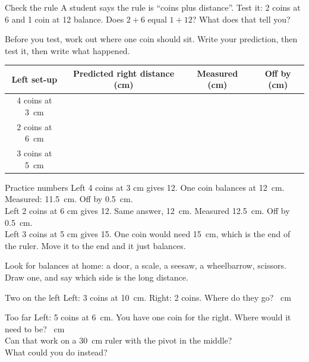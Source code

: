 \begin{puzzle}{Check the rule}
A student says the rule is ``coins plus distance''. Test it: 2 coins at 6 and 1 coin at 12 balance. Does $2+6$ equal $1+12$? \wline[2cm] What does that tell you? \wline[3cm]
\end{puzzle}
\clearpage

Before you test, work out where one coin should sit. Write your prediction, then test it, then write what happened.\par\medskip
\renewcommand{\arraystretch}{1.8}
\begin{tabular}{|c|c|c|c|}
\hline
\textbf{Left set-up} & \textbf{Predicted right distance (cm)} & \textbf{Measured (cm)} & \textbf{Off by (cm)}\\ \hline
4 coins at 3~cm & & & \\ \hline
2 coins at 6~cm & & & \\ \hline
3 coins at 5~cm & & & \\ \hline
\end{tabular}

\begin{worked}{Practice numbers}
Left 4 coins at 3 cm gives 12. One coin balances at 12~cm. Measured: 11.5~cm. Off by 0.5~cm.\\
Left 2 coins at 6 cm gives 12. Same answer, 12~cm. Measured 12.5~cm. Off by 0.5~cm.\\
Left 3 coins at 5 cm gives 15. One coin would need 15~cm, which is the end of the ruler. Move it to the end and it just balances.
\end{worked}

Look for balances at home: a door, a scale, a seesaw, a wheelbarrow, scissors. Draw one, and say which side is the long distance.\par\medskip
{}
\clearpage

\begin{puzzle}{Two on the left}
Left: 3 coins at 10~cm. Right: 2 coins. Where do they go? \wline[1.6cm]~cm
\end{puzzle}

\begin{puzzle}{Too far}
Left: 5 coins at 6~cm. You have one coin for the right. Where would it need to be? \wline[1.6cm]~cm\\
Can that work on a 30~cm ruler with the pivot in the middle? \wline[2cm]\\
What could you do instead? \wline[4cm]
\end{puzzle}

